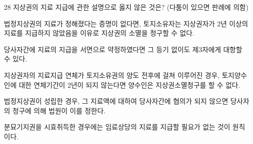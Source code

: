 \begin{question}{28}
지상권의 지료 지급에 관한 설명으로 옳지 않은 것은? (다툼이 있으면 판례에 의함)
\begin{choices}
  \item 법정지상권의 지료가 정해졌다는 증명이 없다면, 토지소유자는 지상권자가 2년 이상의 지료를 지급하지 않았음을 이유로 지상권의 소멸을 청구할 수 없다.
  \item 당사자간에 지료의 지급을 서면으로 약정하였다면 그 등기 없이도 제3자에게 대항할 수 있다.
  \item 지상권자의 지료지급 연체가 토지소유권의 양도 전후에 걸쳐 이루어진 경우, 토지양수인에 대한 연체기간이 2년이 되지 않는다면 양수인은 지상권소멸청구를 할 수 없다.
  \item 법정지상권이 성립한 경우, 그 지료액에 대하여 당사자간에 협의가 되지 않으면 당사자의 청구에 의해 법원이 이를 정한다.
  \item 분묘기지권을 시효취득한 경우에는 임료상당의 지료를 지급할 필요가 없는 것이 원칙이다.
\end{choices}
\end{question}
